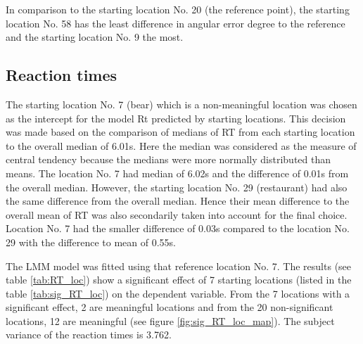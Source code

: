 In comparison to the starting location No. 20 (the reference point), the starting location No. 58 has the least difference in angular error degree to the reference and the starting location No. 9 the most.

\subsection{Reaction times}

The starting location No. 7 (bear) which is a non-meaningful location was chosen as the intercept for the model Rt predicted by starting locations. This decision was made based on the comparison of medians of RT from each starting location to the overall median of 6.01s. Here the median was considered as the measure of central tendency because the medians were more normally distributed than means. The location No. 7 had median of 6.02s and the difference of 0.01s from the overall median. However, the starting location No. 29 (restaurant) had also the same difference from the overall median. Hence their mean difference to the overall mean of RT was also secondarily taken into account for the final choice. Location No. 7 had the smaller difference of 0.03s compared to the location No. 29 with the difference to mean of 0.55s. 

The LMM model was fitted using that reference location No. 7. The results (see table \ref{tab:RT_loc}) show a significant effect of 7 starting locations (listed in the table \ref{tab:sig_RT_loc}) on the dependent variable. From the 7 locations with a significant effect, 2 are meaningful locations and from the 20 non-significant locations, 12 are meaningful (see figure \ref{fig:sig_RT_loc_map}). The subject variance of the reaction times is 3.762.


\begingroup %
\setlength\tabcolsep{3pt}
\footnotesize

\setlength\LTcapwidth{\textwidth} %

\setlength\LTleft{5pt}            %
\setlength\LTright{15pt}           %

